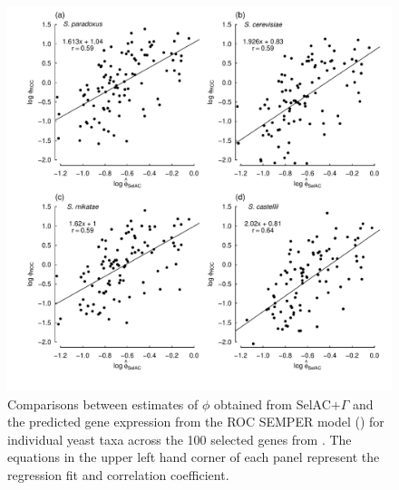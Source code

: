 \documentclass{article}
\newcommand{\selacplusgamma}{SelAC$+\Gamma$\xspace}
\begin{document}
\begin{figure}[H]
  \centering
  \includegraphics[width=0.9\linewidth]{FIGURE_S1_SelACwG_vs_ROC_by_spp.pdf}
  \caption{Comparisons between estimates of $\phi$ obtained from \selacplusgamma and the predicted gene expression from the ROC SEMPER model (\citet{GilchristEtAl2015}) for individual yeast taxa across the 100 selected genes from \citet{SalichosAndRokas2013}.
  The equations in the upper left hand corner of each panel represent the regression fit and correlation coefficient.
  } 
  \label{fig:PhivsROC}
\end{figure}
\end{document}
